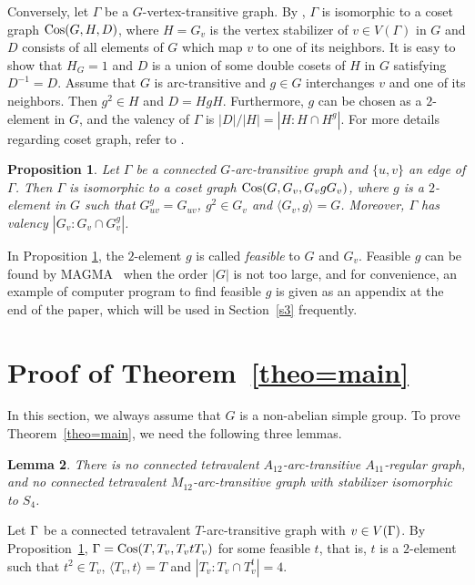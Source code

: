 \documentclass[12pt]{article}
\newtheorem{lem}{Lemma}[section]%
\newtheorem{prop}[lem]{Proposition}%
\def\f{\noindent}
\def\Cos{\hbox{\rm Cos}}
\begin{document}
Conversely, let $\Gamma$ be a $G$-vertex-transitive graph.
By \cite{Sabidussi}, $\Gamma$ is isomorphic to a coset graph $\Cos(G,H,D)$,
where $H=G_{v}$ is the vertex stabilizer of $v\in V(\Gamma)$ in $G$ and $D$
consists of all elements of $G$ which map $v$ to one of its neighbors.
It is easy to show that $H_G=1$ and $D$ is a union of some double cosets
of $H$ in $G$ satisfying $D^{-1}=D$. Assume that $G$ is arc-transitive
and $g \in G$ interchanges $v$ and one of its neighbors. Then $g^2 \in H$
and $D=HgH$. Furthermore, $g$ can be chosen as a $2$-element in $G$,
and the valency of $\Gamma$ is $|D|/|H|=|H:H\cap H^g|$. For more
details regarding coset graph, refer to \cite{FangP,Lorimer,Miller,Sabidussi}.

\begin{prop}\label{prop=cosetgraph}
Let $\Gamma$ be a connected $G$-arc-transitive graph and  $\{u,v\}$ an edge of $\Gamma$.
Then $ \Gamma $ is isomorphic to a coset graph $\Cos(G,G_{v},G_{v}gG_{v})$,
where $g$ is a $2$-element in $G$ such that $G_{uv}^{g}=G_{uv}$, $g^2\in G_{v}$
and $\langle G_v,g\rangle=G$. Moreover, $\Gamma$ has valency $|G_v:G_v \cap G_{v}^{g}|$.
\end{prop}

In Proposition \ref{prop=cosetgraph}, the $2$-element $g$ is called {\em feasible} to $G$ and $G_v$. Feasible $g$ can be found by MAGMA~\cite{magma} when the order $|G|$ is not too large, and for convenience, an example of computer program to find feasible $g$ is given as an appendix at the end of the paper, which will be used in Section~\ref{s3} frequently.


\section{Proof of Theorem~\ref{theo=main}\label{s3} }


In this section, we always assume that $G$ is a non-abelian simple group.
To prove Theorem~\ref{theo=main}, we need the following three lemmas.


\begin{lem}\label{A12}
There is no connected tetravalent $A_{12}$-arc-transitive $A_{11}$-regular graph, and no connected tetravalent $M_{12}$-arc-transitive graph with stabilizer isomorphic to $S_4$.
\end{lem}

\f {\bf Proof:} Let $\Gamma$ be a connected tetravalent $T$-arc-transitive graph with $v\in V(\Gamma)$. By Proposition~\ref{prop=cosetgraph},  $\G=\Cos(T,T_v,T_vtT_v)$ for some feasible $t$, that is, $t$ is a $2$-element such that $t^2\in T_v$, $\langle T_v,t\rangle=T$ and $|T_v:T_v\cap T_v^t|=4$.
\end{document}
